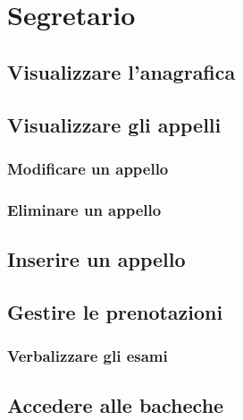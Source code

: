 \documentclass [a4paper,11pt]{book}
\begin{document}
\medskip
\medskip

\section{Segretario}

\subsection{Visualizzare l'anagrafica}

\medskip

\subsection{Visualizzare gli appelli}


\subsubsection{Modificare un appello}

\medskip

\subsubsection{Eliminare un appello}

\medskip

\subsection{Inserire un appello}


\medskip

\subsection{Gestire le prenotazioni}


\subsubsection{Verbalizzare gli esami}

\medskip

\subsection{Accedere alle bacheche}

\end{document}
